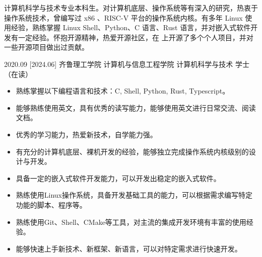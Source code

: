 \documentclass[zh]{resume}
\begin{document}
\makeheader

{\onehalfspacing\hspace{2em}%
计算机科学与技术专业本科生。对计算机底层、操作系统等有深入的研究，热衷于操作系统技术，曾编写过 x86 、RISC-V 平台的操作系统内核。有多年 Linux 使用经验，熟练掌握 Linux Shell、Python、C 语言、Rust 语言，并对嵌入式软件开发有一定经验。怀抱开源精神，热爱开源社区，在 上开源了多个个人项目，并对一些开源项目做出过贡献。
\par}



\begin{educations}
  \education%
    {2020.09}%
    [2024.06]%
    {齐鲁理工学院}%
    {计算机与信息工程学院}%
    {计算机科学与技术}%
    {学士（在读）}
\end{educations}

\begin{itemize}
	\item 熟练掌握以下编程语言和技术：C, Shell, Python, Rust, Typescript。
	\item 能够熟练使用英文，具有优秀的读写能力，能够使用英文进行日常交流、阅读文档。
	\item 优秀的学习能力，热爱新技术，自学能力强。
	\item 有充分的计算机底层、裸机开发的经验，能够独立完成操作系统内核级别的设计与开发。%
	\item 具备一定的嵌入式软件开发能力，可以开发出稳定的嵌入式软件。
	\item 熟练使用Linux操作系统，具备开发基础工具的能力，可以根据需求编写特定功能的脚本、程序等。
	\item 熟练使用Git、Shell、CMake等工具，对主流的集成开发环境有丰富的使用经验。
	\item 能够快速上手新技术、新框架、新语言，可以对特定需求进行快速开发。
\end{itemize}
\end{document}

